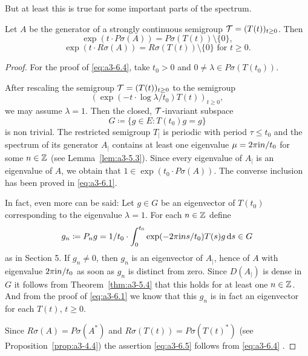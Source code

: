 But at least this is true for some important parts of the spectrum.
\begin{theorem}\label{thm:a3-6.3}%
Let $A$ be the generator of a strongly continuous semigroup $\mathcal{T} = (T(t))_{t \geq 0}$.
Then
\begin{equation}\label{eq:a3-6.4}
\exp(t \cdot P\sigma(A)) = P\sigma(T(t)) \setminus \{0\} ,
\end{equation}
\begin{equation}\label{eq:a3-6.5}
\exp(t \cdot R\sigma(A)) = R\sigma(T(t)) \setminus \{0\} \text{ for } t \geq 0 .
\end{equation}
\end{theorem}
\begin{proof}
For the proof of \eqref{eq:a3-6.4},  take $t_{0} > 0$ and $0 \neq \lambda \in P\sigma(T(t_{0}))$.

After rescaling the semigroup $\mathcal{T} = (T(t))_{t \geq 0}$ to the semigroup
\[
(\exp(-t \cdot \log\lambda/t_{0})T(t))_{t \geq 0} ,
\]
we may assume $\lambda = 1$. 
Then the closed, $\mathcal{T}$-invariant subspace
\[
G \coloneqq \{g \in E \colon T(t_{0})g = g\}
\]
is non trivial.
The restricted semigroup $T_{|}$ is periodic with period $\tau \leq t_{0}$ and the spectrum of its generator $A_{|}$ contains at least one eigenvalue $\mu = 2\pi\mathrm{i} n/t_{0}$ for some $n \in \mathbb{Z}$ (see Lemma~\ref{lem:a3-5.3}).
Since every eigenvalue of $A_{|}$ is an eigenvalue of $A$, we obtain that $1 \in \exp(t_{0} \cdot P\sigma(A))$.
The converse inclusion has been proved in \eqref{eq:a3-6.1}.

In fact, even more can be said: Let $g \in G$ be an eigenvector of $T(t_{0})$ corresponding to the eigenvalue $\lambda = 1$.
For each $n \in \mathbb{Z}$ define
\[
g_{n} \coloneqq P_{n}g = 1/t_{0} \cdot \int_{0}^{t_{0}} \exp(-2\pi\mathrm{i} ns/t_{0})T(s)g  \mathop{}\!\mathrm{d}{s} \in G
\]
as in Section 5.
If $g_{n} \ne 0$, then $g_{n}$ is an eigenvector of $A_{|}$, hence of $A$ with eigenvalue $2\pi\mathrm{i} n/t_{0}$ as soon as $g_{n}$ is distinct from zero.
Since $D(A_{|})$ is dense in $G$ it follows from Theorem~\ref{thm:a3-5.4} that this holds for at least one $n \in \mathbb{Z}$.
And from the proof of \eqref{eq:a3-6.1} we know that this $g_{n}$ is in fact an eigenvector for each $T(t)$, $t \geq 0$.

Since $R\sigma(A) = P\sigma(A^{*})$ and $R\sigma(T(t)) = P\sigma(T(t)^{*})$ (see Proposition~\ref{prop:a3-4.4}) the assertion \eqref{eq:a3-6.5}  follows from \eqref{eq:a3-6.4} .
\end{proof}
